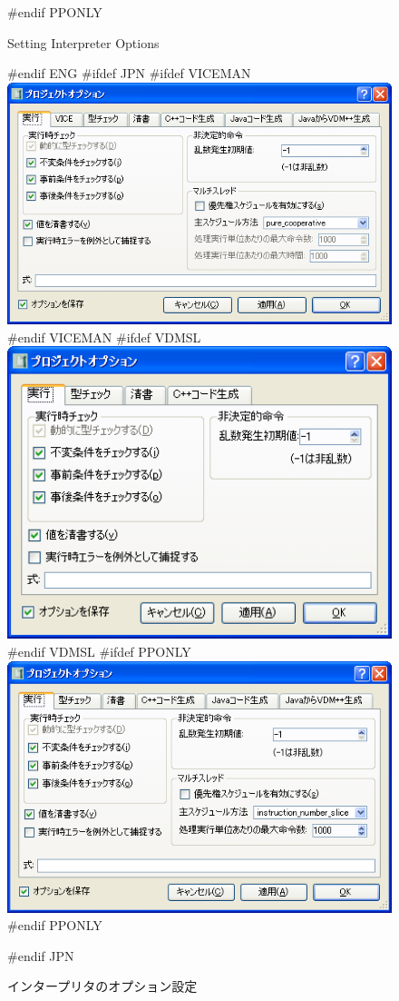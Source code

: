 \documentclass[\pformat,12pt]{article}
\begin{document}
\begin{figure}[tbh]
\begin{center}
#endif PPONLY
\caption{Setting Interpreter Options}
#endif ENG
#ifdef JPN
#ifdef VICEMAN
\includegraphics[width=12.5cm]{interpreterOptions-vice.png}
#endif VICEMAN
#ifdef VDMSL
\includegraphics[width=12.5cm]{interpreterOptions-sl.png}
#endif VDMSL
#ifdef PPONLY
\includegraphics[width=12.5cm]{interpreterOptions-pp.png}
#endif PPONLY
\caption{インタープリタのオプション設定}
#endif JPN
\label{fig:optint}
\end{center}
\end{figure}
\end{document}
